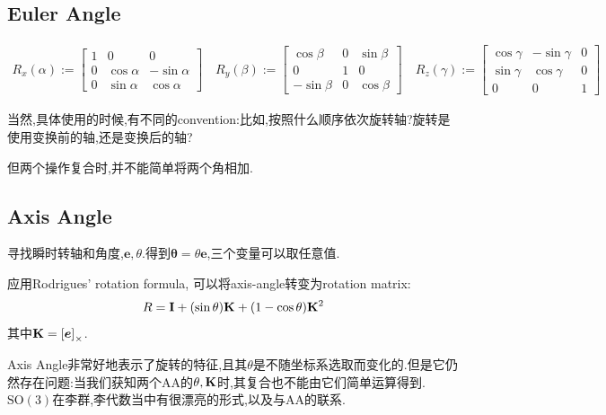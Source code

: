 	\subsection{Euler Angle}
	\begin{equation}
		\begin{array}{l}
			R_{x}(\alpha):=\left[\begin{array}{ccc}
				1 & 0 & 0 \\
				0 & \cos \alpha & -\sin \alpha \\
				0 & \sin \alpha & \cos \alpha
			\end{array}\right] \quad
			R_{y}(\beta):=\left[\begin{array}{ccc}
				\cos \beta & 0 & \sin \beta \\
				0 & 1 & 0 \\
				-\sin \beta & 0 & \cos \beta
			\end{array}\right] \quad
			R_{z}(\gamma):=\left[\begin{array}{ccc}
				\cos \gamma & -\sin \gamma & 0 \\
				\sin \gamma & \cos \gamma & 0 \\
				0 & 0 & 1
			\end{array}\right]
		\end{array}
	\end{equation}

	当然,具体使用的时候,有不同的convention:比如,按照什么顺序依次旋转轴?旋转是使用变换前的轴,还是变换后的轴?
	
	但两个操作复合时,并不能简单将两个角相加.
	
	\subsection{Axis Angle}
	寻找瞬时转轴和角度,$\bm e, \theta$.得到$\bm \theta = \theta \bm e$,三个变量可以取任意值.
	
	应用Rodrigues’ rotation formula, 可以将axis-angle转变为rotation matrix:
	\begin{equation}
		R=\bold{I}+(\sin \theta) \bold{K}+(1-\cos \theta) \bold{K}^{2}
	\end{equation}
	其中$\bold{K} = \left[ \boldsymbol e\right]_{\times}$.
	
	Axis Angle非常好地表示了旋转的特征,且其$\theta$是不随坐标系选取而变化的.但是它仍然存在问题:当我们获知两个AA的$\theta, \bold{K}$时,其复合也不能由它们简单运算得到.$\mathrm{SO(3)}$在李群,李代数当中有很漂亮的形式,以及与AA的联系.
	
